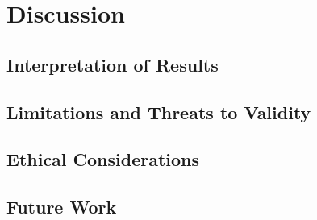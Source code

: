 \chapter{Discussion}
\label{ch:discussion}


\section{Interpretation of Results}
\section{Limitations and Threats to Validity}
\section{Ethical Considerations}
\section{Future Work}
